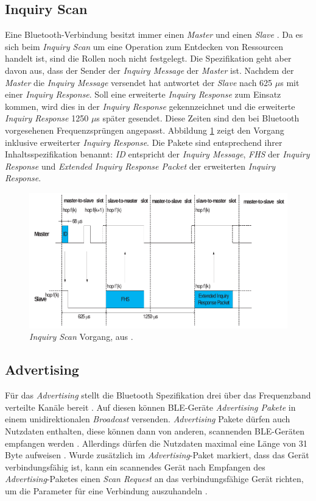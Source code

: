 \subsection{Inquiry Scan}
Eine Bluetooth-Verbindung besitzt immer einen \emph{Master} und einen \emph{Slave} \cite{blue2010inquiry}.
Da es sich beim \emph{Inquiry Scan} um eine Operation zum Entdecken von Ressourcen handelt ist, sind die Rollen noch nicht festgelegt. 
Die Spezifikation geht aber davon aus, dass der Sender der \emph{Inquiry Message} der \emph{Master} ist.
Nachdem der \emph{Master} die \emph{Inquiry Message} versendet hat antwortet der \emph{Slave} nach 625 $\mu$s mit einer \emph{Inquiry Response}. 
Soll eine erweiterte \emph{Inquiry Response} zum Einsatz kommen, wird dies in der \emph{Inquiry Response} gekennzeichnet und die erweiterte \emph{Inquiry Response} 1250 $\mu$s später gesendet.
Diese Zeiten sind den bei Bluetooth vorgesehenen Frequenzsprüngen angepasst.
Abbildung \ref{fig:inqscan} zeigt den Vorgang inklusive erweiterter \emph{Inquiry Response}.
Die Pakete sind entsprechend ihrer Inhaltsspezifikation benannt: \emph{ID} entspricht der \emph{Inquiry Message}, \emph{FHS} der \emph{Inquiry Response} und \emph{Extended Inquiry Response Packet} der erweiterten \emph{Inquiry Response}.

\begin{figure}[h]
  \centering
	\includegraphics[width=\textwidth]{images/inqscan.png}
  \caption{\emph{Inquiry Scan} Vorgang, aus \cite{blue2010inquiry}.}
  \label{fig:inqscan}
\end{figure}

\subsection{Advertising}
Für das \emph{Advertising} stellt die Bluetooth Spezifikation drei über das Frequenzband verteilte Kanäle bereit \cite{blue2010channel}.
Auf diesen können BLE-Geräte \emph{Advertising Pakete} in einem unidirektionalen \emph{Broadcast} versenden.
\emph{Advertising} Pakete dürfen auch Nutzdaten enthalten, diese können dann von anderen, scannenden BLE-Geräten empfangen werden \cite{blue2010advertising}.
Allerdings dürfen die Nutzdaten maximal eine Länge von 31 Byte aufweisen \cite{blue2010pdu}.
Wurde zusätzlich im \emph{Advertising}-Paket markiert, dass das Gerät verbindungsfähig ist, kann ein scannendes Gerät nach Empfangen des \emph{Advertising}-Paketes einen \emph{Scan Request} an das verbindungsfähige Gerät richten, um die Parameter für eine Verbindung auszuhandeln \cite{blue2010scanning}.

